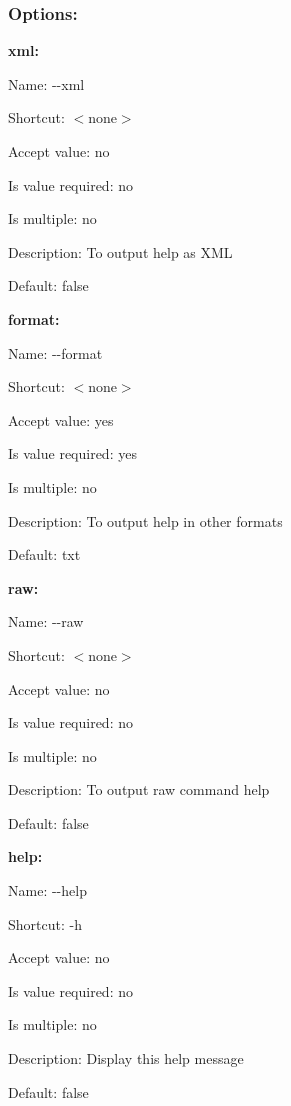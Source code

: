 \subsubsection*{Options\+:}

{\bfseries xml\+:}


\begin{DoxyItemize}
\item Name\+: {\ttfamily -\/-\/xml}
\item Shortcut\+: $<$none$>$
\item Accept value\+: no
\item Is value required\+: no
\item Is multiple\+: no
\item Description\+: To output help as X\+M\+L
\item Default\+: {\ttfamily false}
\end{DoxyItemize}

{\bfseries format\+:}


\begin{DoxyItemize}
\item Name\+: {\ttfamily -\/-\/format}
\item Shortcut\+: $<$none$>$
\item Accept value\+: yes
\item Is value required\+: yes
\item Is multiple\+: no
\item Description\+: To output help in other formats
\item Default\+: {\ttfamily \textquotesingle{}txt\textquotesingle{}}
\end{DoxyItemize}

{\bfseries raw\+:}


\begin{DoxyItemize}
\item Name\+: {\ttfamily -\/-\/raw}
\item Shortcut\+: $<$none$>$
\item Accept value\+: no
\item Is value required\+: no
\item Is multiple\+: no
\item Description\+: To output raw command help
\item Default\+: {\ttfamily false}
\end{DoxyItemize}

{\bfseries help\+:}


\begin{DoxyItemize}
\item Name\+: {\ttfamily -\/-\/help}
\item Shortcut\+: {\ttfamily -\/h}
\item Accept value\+: no
\item Is value required\+: no
\item Is multiple\+: no
\item Description\+: Display this help message
\item Default\+: {\ttfamily false}
\end{DoxyItemize}

